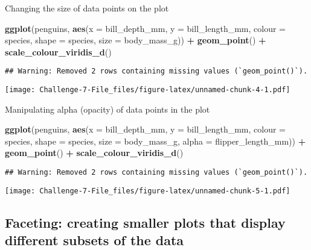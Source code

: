 \documentclass[
]{article}
\newenvironment{Shaded}{\begin{snugshade}}{\end{snugshade}}
\newcommand{\AttributeTok}[1]{\textcolor[rgb]{0.13,0.29,0.53}{#1}}
\newcommand{\FunctionTok}[1]{\textcolor[rgb]{0.13,0.29,0.53}{\textbf{#1}}}
\newcommand{\NormalTok}[1]{#1}
\newcommand{\SpecialCharTok}[1]{\textcolor[rgb]{0.81,0.36,0.00}{\textbf{#1}}}
\begin{document}
Changing the size of data points on the plot

\begin{Shaded}
\begin{Highlighting}[]
\FunctionTok{ggplot}\NormalTok{(penguins, }\FunctionTok{aes}\NormalTok{(}\AttributeTok{x =}\NormalTok{ bill\_depth\_mm, }\AttributeTok{y =}\NormalTok{ bill\_length\_mm, }\AttributeTok{colour =}\NormalTok{ species, }\AttributeTok{shape =}\NormalTok{ species,}
\AttributeTok{size =}\NormalTok{ body\_mass\_g)) }\SpecialCharTok{+}
\FunctionTok{geom\_point}\NormalTok{() }\SpecialCharTok{+} \FunctionTok{scale\_colour\_viridis\_d}\NormalTok{()}
\end{Highlighting}
\end{Shaded}

\begin{verbatim}
## Warning: Removed 2 rows containing missing values (`geom_point()`).
\end{verbatim}

\texttt{[image: Challenge-7-File\_files/figure-latex/unnamed-chunk-4-1.pdf]}

Manipulating alpha (opacity) of data points in the plot

\begin{Shaded}
\begin{Highlighting}[]
\FunctionTok{ggplot}\NormalTok{(penguins, }\FunctionTok{aes}\NormalTok{(}\AttributeTok{x =}\NormalTok{ bill\_depth\_mm, }\AttributeTok{y =}\NormalTok{ bill\_length\_mm, }\AttributeTok{colour =}\NormalTok{ species,}
\AttributeTok{shape =}\NormalTok{ species, }\AttributeTok{size =}\NormalTok{ body\_mass\_g, }\AttributeTok{alpha =}\NormalTok{ flipper\_length\_mm)) }\SpecialCharTok{+}
\FunctionTok{geom\_point}\NormalTok{() }\SpecialCharTok{+} \FunctionTok{scale\_colour\_viridis\_d}\NormalTok{()}
\end{Highlighting}
\end{Shaded}

\begin{verbatim}
## Warning: Removed 2 rows containing missing values (`geom_point()`).
\end{verbatim}

\texttt{[image: Challenge-7-File\_files/figure-latex/unnamed-chunk-5-1.pdf]}

\hypertarget{faceting-creating-smaller-plots-that-display-different-subsets-of-the-data}{%
\subsection{Faceting: creating smaller plots that display different
subsets of the
data}\label{faceting-creating-smaller-plots-that-display-different-subsets-of-the-data}}
\end{document}
